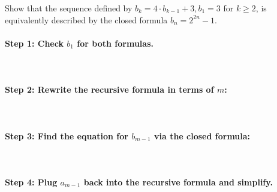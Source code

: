 \documentclass[a4paper,12pt]{book}
\newcounter{question}
\begin{document}
        \begin{questionNOGRADE}{\thequestion}

            Show that the sequence defined by $b_{k} = 4 \cdot b_{k-1} + 3, b_{1} = 3$ for $k \geq 2$,
            is equivalently described by the closed formula $b_{n} = 2^{2n} - 1$.

        \paragraph{Step 1: Check $b_{1}$ for both formulas.} ~\\
            
        \paragraph{Step 2: Rewrite the recursive formula in terms of $m$:} ~\\

        \paragraph{Step 3: Find the equation for $b_{m-1}$ via the closed formula:} ~\\

        \paragraph{Step 4: Plug $a_{m-1}$ back into the recursive formula and simplify.} ~\\

        \end{questionNOGRADE}
\end{document}
